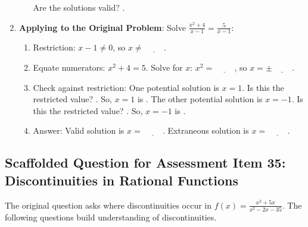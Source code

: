 \documentclass[12pt]{article}
\begin{document}
\begin{enumerate}[label=34.\arabic*]
\begin{enumerate}[label=\alph*)]
        Are the solutions valid? \underline{\hspace{0.5cm}}.
    \end{enumerate}
    \item \textbf{Applying to the Original Problem}: Solve \( \frac{x^2 + 4}{x - 1} = \frac{5}{x - 1} \):
    \begin{enumerate}[label=\alph*)]
        \item Restriction: \( x - 1 \neq 0 \), so \( x \neq \underline{\hspace{1cm}} \).
        \item Equate numerators: \( x^2 + 4 = 5 \). Solve for \(x\): \( x^2 = \underline{\hspace{1cm}} \), so \( x = \pm \underline{\hspace{1cm}} \).
        \item Check against restriction:
        One potential solution is \( x = 1 \). Is this the restricted value? \underline{\hspace{0.5cm}}. So, \( x = 1 \) is \underline{\hspace{1.5cm}}.
        The other potential solution is \( x = -1 \). Is this the restricted value? \underline{\hspace{0.5cm}}. So, \( x = -1 \) is \underline{\hspace{1.5cm}}.
        \item Answer: Valid solution is \( x = \underline{\hspace{1cm}} \). Extraneous solution is \( x = \underline{\hspace{1cm}} \).
    \end{enumerate}
\end{enumerate}

\subsection*{Scaffolded Question for Assessment Item 35: Discontinuities in Rational Functions}
The original question asks where discontinuities occur in \( f(x) = \frac{x^2 + 5x}{x^2 - 2x - 35} \). The following questions build understanding of discontinuities.
\end{document}
